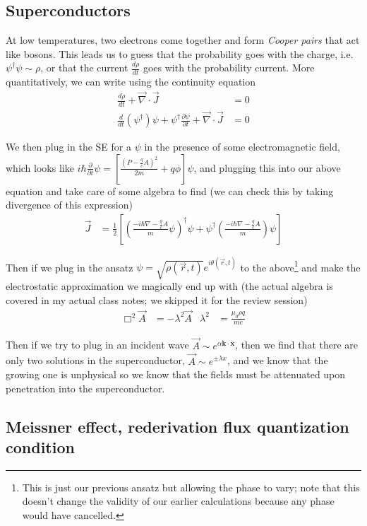 \documentclass[12pt]{article}
\newcommand{\rd}[2]{\frac{d#1}{d#2}}
\newcommand{\pd}[2]{\frac{\partial#1}{\partial#2}}
\begin{document}
\subsection{Superconductors}
At low temperatures, two electrons come together and form \emph{Cooper pairs} that act like bosons. This leads us to guess that the probability goes with the charge, i.e. $\psi^\dagger\psi \sim \rho$, or that the current $\rd{\rho}{t}$ goes with the probability current. More quantitatively, we can write using the  continuity equation
\begin{align}
    \rd{\rho}{t} + \vec{\nabla} \cdot \vec{J} &= 0\\
    \rd{}{t}\left( \psi^\dagger \right)\psi + \psi^\dagger\pd{\psi}{t} + \vec{\nabla} \cdot \vec{J}&= 0
\end{align}

We then plug in the SE for a $\psi$ in the presence of some electromagnetic field, which looks like $i\hbar \pd{}{t}\psi = \left[ \frac{\left( P - \frac{q}{c}A \right)^2}{2m} + q\phi \right]\psi$, and plugging this into our above equation and take care of some algebra to find (we can check this by taking divergence of this expression)
\begin{align}
    \vec{J} &= \frac{1}{2}\left[ \left( \frac{-i\hbar \nabla - \frac{q}{c}A}{m} \psi\right)^\dagger\psi + \psi^\dagger\left( \frac{-i\hbar \nabla - \frac{q}{c}A}{m} \right)\psi \right]
\end{align}

Then if we plug in the ansatz $\psi = \sqrt{\rho(\vec{r},t)}e^{i\theta(\vec{r},t)}$ to the above\footnote{This is just our previous ansatz but allowing the phase to vary; note that this doesn't change the validity of our earlier calculations because any phase would have cancelled.} and make the electrostatic approximation we magically end up with (the actual algebra is covered in my actual class notes; we skipped it for the review session)
\begin{align}
    \Box^2\vec{A} &= -\lambda^2\vec{A} & \lambda^2 &= \frac{\mu_0\rho q}{mc}
\end{align}

Then if we try to plug in an incident wave $\vec{A} \sim e^{\alpha \mathbf{k} \cdot \mathbf{x}}$, then we find that there are only two solutions in the superconductor, $\vec{A} \sim e^{\pm \lambda x}$, and we know that the growing one is unphysical so we know that the fields must be attenuated upon penetration into the superconductor.

\subsection{Meissner effect, rederivation flux quantization condition}
\end{document}
